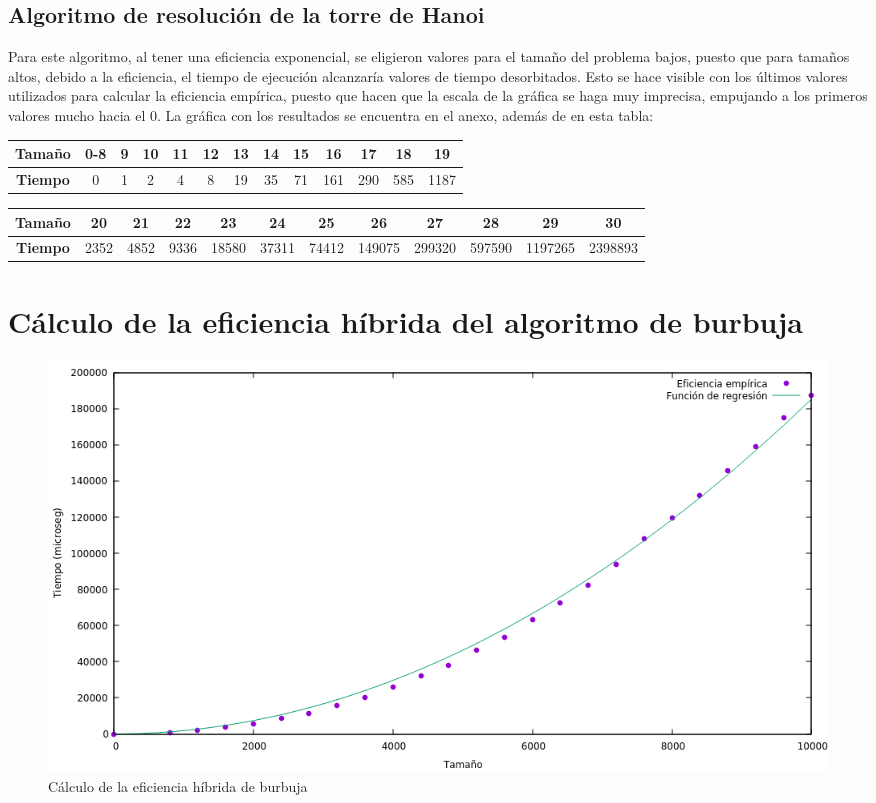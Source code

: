 \documentclass[11pt,twoside,titlepage,a4paper]{article}
\begin{document}
\subsection{Algoritmo de resolución de la torre de Hanoi}
Para este algoritmo, al tener una eficiencia exponencial, se eligieron valores para el tamaño del problema
bajos, puesto que para tamaños altos, debido a la eficiencia, el tiempo de ejecución alcanzaría valores de
tiempo desorbitados. Esto se hace visible con los últimos valores utilizados para calcular la eficiencia 
empírica, puesto que hacen que la escala de la gráfica se haga muy imprecisa, empujando a los primeros
valores mucho hacia el 0. La gráfica con los resultados se encuentra en el anexo, además de en esta tabla:
\begin{center}\begin{tabular}{|c|c|c|c|c|c|c|c|c|c|c|c|c|}
\hline
\textbf{Tamaño} & 0-8 & 9 & 10 & 11 & 12 & 13 & 14 & 15 & 16 & 17 & 18 & 19 \\ \hline
\textbf{Tiempo} & 0 & 1 & 2 & 4 & 8 & 19 & 35 & 71 & 161 & 290 & 585 & 1187 \\ \hline
\end{tabular}\end{center}
\begin{center}\begin{tabular}{|c|c|c|c|c|c|c|c|c|c|c|c|}
\hline
\textbf{Tamaño} & 20 & 21 & 22 & 23 & 24 & 25 & 26 & 27 & 28 & 29 & 30 \\ \hline
\textbf{Tiempo} & 2352 & 4852 & 9336 & 18580 & 37311 & 74412 & 149075 & 299320 & 597590 & 1197265 & 2398893
\\ \hline
\end{tabular}\end{center}

\section{Cálculo de la eficiencia híbrida del algoritmo de burbuja}
\begin{figure}[htp]
\centering
\includegraphics[scale=0.50]{burbuja_hibrida.png}
\caption{Cálculo de la eficiencia híbrida de burbuja}
\label{Eficiencia híbrida del algoritmo de burbuja}
\end{figure}
\end{document}
